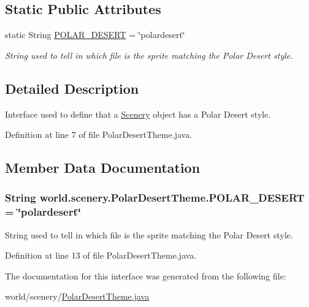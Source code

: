\subsection*{Static Public Attributes}
\begin{DoxyCompactItemize}
\item 
static String \hyperlink{interfaceworld_1_1scenery_1_1_polar_desert_theme_a48dd1801e0146ea2306dadcbdee81b77}{P\-O\-L\-A\-R\-\_\-\-D\-E\-S\-E\-R\-T} = \char`\"{}polardesert\char`\"{}
\begin{DoxyCompactList}\small\item\em String used to tell in which file is the sprite matching the Polar Desert style. \end{DoxyCompactList}\end{DoxyCompactItemize}


\subsection{Detailed Description}
Interface used to define that a \hyperlink{classworld_1_1scenery_1_1_scenery}{Scenery} object has a Polar Desert style. 

Definition at line 7 of file Polar\-Desert\-Theme.\-java.



\subsection{Member Data Documentation}
\hypertarget{interfaceworld_1_1scenery_1_1_polar_desert_theme_a48dd1801e0146ea2306dadcbdee81b77}{
\subsubsection[{P\-O\-L\-A\-R\-\_\-\-D\-E\-S\-E\-R\-T}]{\setlength{\rightskip}{0pt plus 5cm}String world.\-scenery.\-Polar\-Desert\-Theme.\-P\-O\-L\-A\-R\-\_\-\-D\-E\-S\-E\-R\-T = \char`\"{}polardesert\char`\"{}\hspace{0.3cm}{\ttfamily [static]}}}\label{interfaceworld_1_1scenery_1_1_polar_desert_theme_a48dd1801e0146ea2306dadcbdee81b77}


String used to tell in which file is the sprite matching the Polar Desert style. 



Definition at line 13 of file Polar\-Desert\-Theme.\-java.



The documentation for this interface was generated from the following file\-:\begin{DoxyCompactItemize}
\item 
world/scenery/\hyperlink{_polar_desert_theme_8java}{Polar\-Desert\-Theme.\-java}\end{DoxyCompactItemize}
